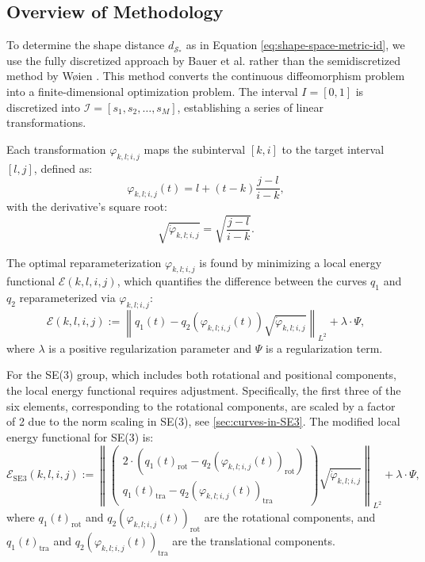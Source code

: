 \subsection{Overview of Methodology}
\label{subsec:overview-of-methodology-dp}

To determine the shape distance \(d_{\mathcal{S}_*}\) as in Equation \eqref{eq:shape-space-metric-id}, we use the fully discretized approach by Bauer et al. \cite{bauerLandmarkGuidedElasticShape2015} rather than the semidiscretized method by Wøien \cite{woienSemiDiscretizedMethodOptimal2019}. This method converts the continuous diffeomorphism problem into a finite-dimensional optimization problem. The interval \(I = [0,1]\) is discretized into \(\mathcal{I} = [s_1, s_2, \ldots, s_M]\), establishing a series of linear transformations.

Each transformation \(\varphi_{k,l;i,j}\) maps the subinterval \([k, i]\) to the target interval \([l, j]\), defined as:
\begin{equation}
    \varphi_{k,l;i,j}(t) = l + (t - k) \frac{j - l}{i - k},
\end{equation}
with the derivative's square root:
\begin{equation}
    \sqrt{\dot{\varphi}_{k,l;i,j}} = \sqrt{\frac{j - l}{i - k}}.
\end{equation}

The optimal reparameterization \(\varphi_{k,l;i,j}\) is found by minimizing a local energy functional \(\mathcal{E}(k, l, i, j)\), which quantifies the difference between the curves \(q_1\) and \(q_2\) reparameterized via \(\varphi_{k,l;i,j}\):
\begin{equation}
    \mathcal{E}(k, l, i, j) := \left\| q_1(t) - q_2(\varphi_{k,l;i,j}(t)) \sqrt{\dot{\varphi}_{k,l;i,j}} \right\|_{L^2} + \lambda \cdot \Psi,
    \label{eq:local-cost-functional}
\end{equation}
where \(\lambda\) is a positive regularization parameter and \(\Psi\) is a regularization term.

For the SE(3) group, which includes both rotational and positional components, the local energy functional requires adjustment. Specifically, the first three of the six elements, corresponding to the rotational components, are scaled by a factor of 2 due to the norm scaling in SE(3), see \ref{sec:curves-in-SE3}. The modified local energy functional for SE(3) is:
\begin{equation}
    \mathcal{E}_{\mathrm{SE3}}(k, l, i, j) := \left\| \begin{pmatrix}
    2 \cdot \left( q_1(t)_{\text{rot}} - q_2(\varphi_{k,l;i,j}(t))_{\text{rot}} \right) \\
    q_1(t)_{\text{tra}} - q_2(\varphi_{k,l;i,j}(t))_{\text{tra}} 
    \end{pmatrix} \sqrt{\dot{\varphi}_{k,l;i,j}} \right\|_{L^2} + \lambda \cdot \Psi,
    \label{eq:local-cost-functional-SE3}
\end{equation}
where \( q_1(t)_{\text{rot}} \) and \( q_2(\varphi_{k,l;i,j}(t))_{\text{rot}} \) are the rotational components, and \( q_1(t)_{\text{tra}} \) and \( q_2(\varphi_{k,l;i,j}(t))_{\text{tra}} \) are the translational components.

